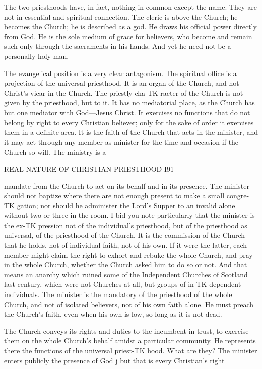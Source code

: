 \documentclass[12pt,a5paper,twoside]{book}
\begin{document}
{The two priesthoods have, in fact, nothing in 
common except the name. They are not in essential 
and spiritual connection. The cleric is above the 
Church; he becomes the Church; he is described as 
a god. He draws his official power directly from God. 
He is the sole medium of grace for believers, who 
become and remain such only through the sacraments 
in his hands. And yet he need not be a personally 
holy man. 

The evangelical position is a very clear antagonism. 
The spiritual office is a projection of the universal 
priesthood. It is an organ of the Church, and not 
Christ's vicar in the Church. The priestly cha-TK
racter of the Church is not given by the priesthood, 
but to it. It has no mediatorial place, as the Church 
has but one mediator with God---Jesus Christ. It 
exercises no functions that do not belong by right to 
every Christian believer; only for the sake of order it 
exercises them in a definite area. It is the faith of the 
Church that acts in the minister, and it may act 
through any member as minister for the time and 
occasion if the Church so will. The ministry is a 



REAL NATURE OF CHRISTIAN PRIESTHOOD I91 

mandate from the Church to act on its behalf and in 
its presence. The minister should not baptize where 
there are not enough present to make a small congre-TK
gation; nor should he administer the Lord's Supper 
to an invalid alone without two or three in the room. 
I bid you note particularly that the minister is the ex-TK
pression not of the individual's priesthood, but of the 
priesthood as universal, of the priesthood of the Church. 
It is the commission of the Church that he holds, not 
of individual faith, not of his own. If it were the 
latter, each member might claim the right to exhort 
and rebuke the whole Church, and pray in the whole 
Church, whether the Church asked him to do so or 
not. And that means an anarchy which ruined some 
of the Independent Churches of Scotland last century, 
which were not Churches at all, but groups of in-TK
dependent individuals. The minister is the mandatory 
of the priesthood of the whole Church, and not of 
isolated believers, not of his own faith alone. He 
must preach the Church's faith, even when his own 
is low, so long as it is not dead. 

The Church conveys its rights and duties to the 
incumbent in trust, to exercise them on the whole 
Church's behalf amidst a particular community. He 
represents there the functions of the universal priest-TK
hood. What are they? The minister enters publicly the 
presence of God j but that is every Christian's right 



}
\end{document}
